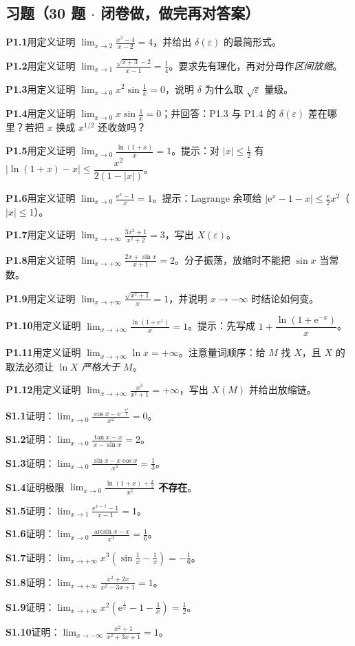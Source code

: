 \documentclass[11pt,a4paper]{ctexart}
\newcommand{\eps}{\varepsilon}
\newcommand{\abs}[1]{\left\lvert #1\right\rvert}
\newcommand{\ee}{\mathrm{e}}
\newcommand{\q}[2]{\par\medskip\noindent\textbf{#1}\quad #2\par}
\begin{document}
\subsection{习题（30 题 $\cdot$ 闭卷做，做完再对答案）}
\q{P1.1}{用定义证明 $\displaystyle\lim_{x\to 2}\frac{x^{2}-4}{x-2}=4$，并给出 $\delta(\eps)$ 的最简形式。}
\q{P1.2}{用定义证明 $\displaystyle\lim_{x\to 1}\frac{\sqrt{x+3}-2}{x-1}=\frac{1}{4}$。要求先有理化，再对分母作\emph{区间放缩}。}
\q{P1.3}{用定义证明 $\displaystyle\lim_{x\to 0}x^{2}\sin\frac{1}{x}=0$，说明 $\delta$ 为什么取 $\sqrt{\eps}$ 量级。}
\q{P1.4}{用定义证明 $\displaystyle\lim_{x\to 0}x\sin\frac{1}{x}=0$；并回答：P1.3 与 P1.4 的 $\delta(\eps)$ 差在哪里？若把 $x$ 换成 $x^{1/2}$ 还收敛吗？}
\q{P1.5}{用定义证明 $\displaystyle\lim_{x\to 0}\frac{\ln(1+x)}{x}=1$。提示：对 $\abs{x}\le \frac{1}{2}$ 有 $\abs{\ln(1+x)-x}\le \dfrac{x^{2}}{2(1-\abs{x})}$。}
\q{P1.6}{用定义证明 $\displaystyle\lim_{x\to 0}\frac{\ee^{x}-1}{x}=1$。提示：Lagrange 余项给 $\abs{\ee^{x}-1-x}\le \frac{\ee}{2}x^{2}$（$\abs{x}\le 1$）。}
\q{P1.7}{用定义证明 $\displaystyle\lim_{x\to +\infty}\frac{3x^{2}+1}{x^{2}+2}=3$，写出 $X(\eps)$。}
\q{P1.8}{用定义证明 $\displaystyle\lim_{x\to +\infty}\frac{2x+\sin x}{x+1}=2$。分子振荡，放缩时不能把 $\sin x$ 当常数。}
\q{P1.9}{用定义证明 $\displaystyle\lim_{x\to +\infty}\frac{\sqrt{x^{2}+1}}{x}=1$，并说明 $x\to -\infty$ 时结论如何变。}
\q{P1.10}{用定义证明 $\displaystyle\lim_{x\to +\infty}\frac{\ln(1+\ee^{x})}{x}=1$。提示：先写成 $1+\dfrac{\ln(1+\ee^{-x})}{x}$。}
\q{P1.11}{用定义证明 $\displaystyle\lim_{x\to +\infty}\ln x=+\infty$。注意量词顺序：给 $M$ 找 $X$，且 $X$ 的取法必须让 $\ln X$ \emph{严格大于} $M$。}
\q{P1.12}{用定义证明 $\displaystyle\lim_{x\to +\infty}\frac{x^{3}}{x^{2}+1}=+\infty$，写出 $X(M)$ 并给出放缩链。}
\q{S1.1}{证明：$\displaystyle\lim_{x\to0}\frac{\cos x-\ee^{-\frac{x^{2}}{2}}}{x^{2}}=0$。}
\q{S1.2}{证明：$\displaystyle\lim_{x\to0}\frac{\tan x-x}{x-\sin x}=2$。}
\q{S1.3}{证明：$\displaystyle\lim_{x\to0}\frac{\sin x-x\cos x}{x^{3}}=\frac13$。}
\q{S1.4}{证明极限 $\displaystyle\lim_{x\to0}\frac{\ln(1+x)+\frac{x}{2}}{x^{2}}$ \textbf{不存在}。}
\q{S1.5}{证明：$\displaystyle\lim_{x\to1}\frac{\ee^{x-1}-1}{x-1}=1$。}
\q{S1.6}{证明：$\displaystyle\lim_{x\to0}\frac{\arcsin x-x}{x^{3}}=\frac16$。}
\q{S1.7}{证明：$\displaystyle\lim_{x\to+\infty}x^{3}\left(\sin\frac1x-\frac1x\right)=-\frac16$。}
\q{S1.8}{证明：$\displaystyle\lim_{x\to+\infty}\frac{x^{2}+2x}{x^{2}-3x+1}=1$。}
\q{S1.9}{证明：$\displaystyle\lim_{x\to+\infty}x^{2}\left(\ee^{\frac1x}-1-\frac1x\right)=\frac12$。}
\q{S1.10}{证明：$\displaystyle\lim_{x\to-\infty}\frac{x^{2}+1}{x^{2}+3x+1}=1$。}
\end{document}
